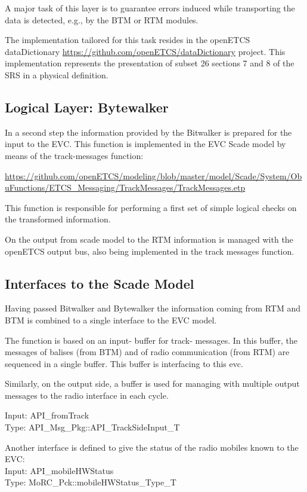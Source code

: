 \documentclass{template/openetcs_report}
\begin{document}
A major task of this layer is to guarantee errors induced while transporting the data is detected, e.g., by the BTM or RTM modules.

The implementation tailored for this task resides in the openETCS dataDictionary \url{https://github.com/openETCS/dataDictionary} project. This implementation represents the presentation of subset 26 sections 7 and 8 of the SRS in a physical definition.

\subsection{Logical Layer: Bytewalker}

In a second step the information provided by the Bitwalker is prepared for the input to the EVC. This function is implemented in the EVC Scade model by means of the track-messages function:

\url{https://github.com/openETCS/modeling/blob/master/model/Scade/System/ObuFunctions/ETCS_Messaging/TrackMessages/TrackMessages.etp}

This function is responsible for performing a first set of simple logical checks on the transformed information.

On the output from scade model to the RTM information is managed with the openETCS output bus, also being implemented in the track messages function.

\subsection{Interfaces to the Scade Model}

Having passed Bitwalker and Bytewalker the information coming from RTM and BTM is combined to a single interface to the EVC model.

The function is based on an input- buffer for track- messages. In this buffer, the messages of balises (from BTM) and of radio communication (from RTM) are sequenced in a single buffer. This buffer is interfacing to this evc.

Similarly, on the output side, a buffer is used for managing with multiple output messages to the radio interface in each cycle.

Input: API\_fromTrack\\
Type: API\_Msg\_Pkg::API\_TrackSideInput\_T

Another interface is defined to give the status of the radio mobiles known to the EVC:\\
Input: API\_mobileHWStatus\\
Type: MoRC\_Pck::mobileHWStatus\_Type\_T
\end{document}
